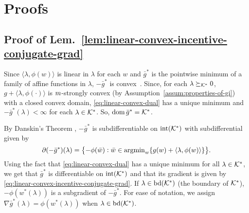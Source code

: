 \appendices

\section{Proofs}
\label{app:proofs}


\subsection{Proof of Lem.~\ref{lem:linear-convex-incentive-conjugate-grad}}
\label{subapp:proof-linear-convex-incentive-conjugate-grad}

Since $\langle \lambda, \phi(w)\rangle$ is linear in $\lambda$ for each $w$ and $\bar{g}^*$ is the pointwise minimum of a family of affine functions in $\lambda$, $-\bar{g}^*$ is convex~\cite[Sec.~3.2.3]{boyd2004convex}.
Since, for each $\lambda \succeq_{\mathcal{K}^*} 0$, $g + \langle \lambda, \phi(\cdot)\rangle$ is $m$-strongly convex (by Assumption~\ref{assum:properties-of-gi}) with a closed convex domain, \eqref{eq:linear-convex-dual} has a unique minimum and $-\bar{g}^*(\lambda) < \infty$ for each $\lambda \in \mathcal{K}^*$.
So, $\operatorname{dom}{\bar{g}^*} = \mathcal{K}^*$.

By Danskin's Theorem \cite[Prop.~B.25]{bertsekas1997nonlinear}%
, $-\bar{g}^*$ is subdifferentiable on $\operatorname{int}(\mathcal{K}^*)$ with subdifferential given by
\begin{equation*}
    \partial (-\bar{g}^*)(\lambda) = \bigl\{ -\phi(\bar{w}): \bar{w} \in \textstyle{\operatorname*{argmin}}_w \{g(w) + \langle \lambda, \phi(w)\rangle\} \bigr\}.
\end{equation*}
Using the fact that \eqref{eq:linear-convex-dual} has a unique minimum for all $\lambda \in \mathcal{K}^*$, we get that $\bar{g}^*$ is differentiable on $\operatorname{int}(\mathcal{K}^*)$ and that its gradient is given by \eqref{eq:linear-convex-incentive-conjugate-grad}.
If $\lambda \in \operatorname{bd}(\mathcal{K}^*)$ (the boundary of $\mathcal{K}^*$), $-\phi(w^*(\lambda))$ is a subgradient of $-\bar{g}^*$.
For ease of notation, we assign $\nabla \bar{g}^*(\lambda) = \phi(w^*(\lambda))$ when $\lambda \in \operatorname{bd}(\mathcal{K}^*)$.

